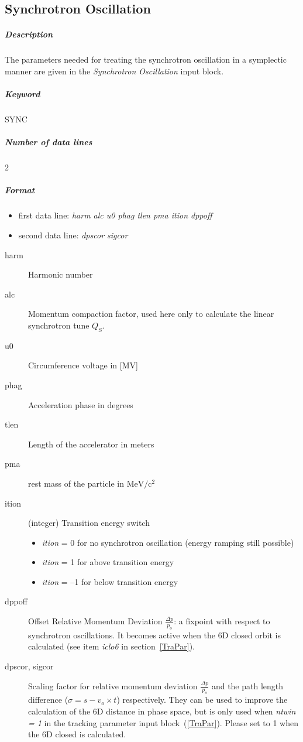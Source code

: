 \documentclass[a4paper,11pt]{report}
\begin{document}
\subsection{Synchrotron Oscillation} \label{SynOsc}

\subparagraph{Description} The parameters needed for treating the
synchrotron oscillation in a symplectic manner are given in the {\em
  Synchrotron Oscillation} \/input block.

\subparagraph{Keyword} SYNC \subparagraph{Number of data lines} 2

\subparagraph{Format}
\begin{itemize}
\item first data line: {\em harm alc u0 phag tlen pma ition dppoff}
\item second data line: {\em dpscor sigcor}
\end{itemize}

\begin{description}
\item [harm] Harmonic number
\item [alc] Momentum compaction factor, used here only to calculate
  the linear synchrotron tune $ Q_{S} $.
\item [u0] Circumference voltage in [MV]
\item [phag] Acceleration phase in degrees
\item [tlen] Length of the accelerator in meters
\item [pma] rest mass of the particle in $ \mathrm{MeV}/\mathrm{c}^{2}
  $
\item [ition] (integer) Transition energy switch
 \begin{itemize}
 \item {\em ition} = \hspace{.3mm} 0 for no synchrotron oscillation
   (energy ramping still possible)
 \item {\em ition} = \hspace{.5mm} 1 for above transition energy
 \item {\em ition} = --1 for below transition energy
 \end{itemize}
\item [dppoff]  Offset Relative Momentum Deviation \mbox{$ \frac{\Delta
      p}{p_o} $}: a fixpoint with respect to synchrotron oscillations.
  It becomes active when the 6D closed orbit is calculated (see item
  {\it iclo6} \/in section~\ref{TraPar}).
\item [dpscor, sigcor] Scaling factor for relative momentum deviation
  \mbox{$ \frac{\Delta p}{p_o} $} and the path length difference
  ($\sigma = s - v_o \times t$) respectively.  They can be used to
  improve the calculation of the 6D distance in phase space, but is
  only used when {\em ntwin = 1} \/in the tracking parameter input
  block~(\ref{TraPar}). Please set to 1 when the 6D closed is
  calculated.
\end{description}
\end{document}
